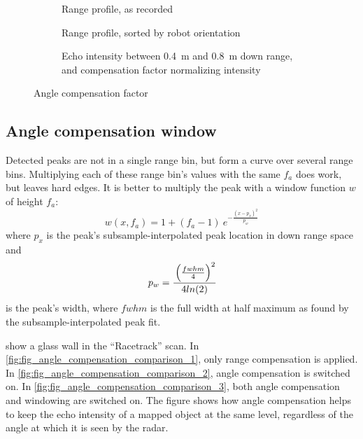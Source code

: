 \begin{figure}[htbp]
    \centering
    \begin{subfigure}{.85\textwidth}
        \centering
        \def\svgwidth{\linewidth} \small
        
        \caption{Range profile, as recorded} \label{fig:angle-1}
        \bigskip
    \end{subfigure}
    \begin{subfigure}{.85\textwidth}
        \centering
        \def\svgwidth{\linewidth} \small
        
        \caption{Range profile, sorted by robot orientation} \label{fig:angle-2}
        \bigskip
    \end{subfigure}
    \begin{subfigure}{.85\textwidth}
        \centering
        \def\svgwidth{\linewidth} \small
        
        \caption{Echo intensity between \SI{0.4}{m} and \SI{0.8}{m} down range, and compensation factor normalizing intensity} \label{fig:angle-3}
        \bigskip
    \end{subfigure}
    \caption{Angle compensation factor}
    \label{fig:fig_angle_compensation}
\end{figure}

\subsection{Angle compensation window}\label{angle-compensation-window}

Detected peaks are not in a single range bin, but form a curve over
several range bins. Multiplying each of these range bin's values with
the same \(f_a\) does work, but leaves hard edges. It is better to
multiply the peak with a window function $w$ of height \(f_a\):
\begin{equation}
w(x,f_a) = 1 + (f_a - 1) ~e ^ { -\frac{ \left( {x - p_x} \right) ^ 2 } {p_w} }
\end{equation}
where \(p_x\) is the peak's subsample-interpolated peak location in
down range space and
\begin{equation}
p_w = \cfrac{
\left( \frac{fwhm}{4}  \right) ^2
}{
4 ln(2)}
\end{equation}
is the peak's width, where \(fwhm\) is the full width at half maximum as
found by the subsample-interpolated peak fit.

 show a glass wall in the ``Racetrack'' scan. In \cref{fig:fig_angle_compensation_comparison_1}, only range compensation is applied. In \cref{fig:fig_angle_compensation_comparison_2},
angle compensation is switched on. In \cref{fig:fig_angle_compensation_comparison_3}, both angle
compensation and windowing are switched on. The
figure shows how angle compensation helps to keep the echo intensity of
a mapped object at the same level, regardless of the angle at which it
is seen by the radar.

